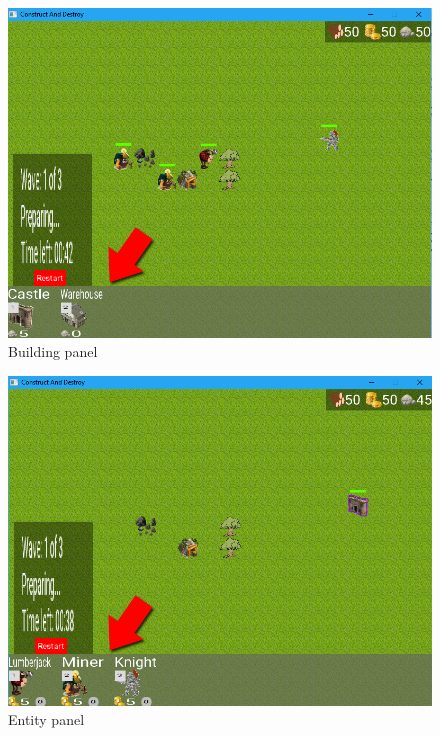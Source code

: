 \begin{figure}
    \centering
    \includegraphics[scale=0.5]{res/building-panel.png}
    \caption{Building panel}\label{fig:building-panel}
\end{figure}

\begin{figure}
    \centering
    \includegraphics[scale=0.5]{res/entity-panel.png}
    \caption{Entity panel}\label{fig:entity-panel}
\end{figure}

